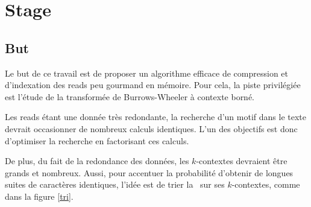 \section{Stage}

\subsection{But}
Le but de ce travail est de proposer un algorithme efficace de compression et d'indexation des reads peu gourmand en mémoire. Pour cela, la piste privilégiée est l'étude de la transformée de Burrows-Wheeler à contexte borné. 

Les reads étant une donnée très redondante, la recherche d'un motif dans le texte devrait occasionner de nombreux calculs identiques. L'un des objectifs est donc d'optimiser la recherche en factorisant ces calculs. 

De plus, du fait de la redondance des données, les $k$-contextes devraient être grands et nombreux. Aussi, pour accentuer la probabilité d'obtenir de longues suites de caractères identiques, l'idée est de trier la \kbwt\ sur ses $k$-contextes, comme dans la figure \ref{tri}.

